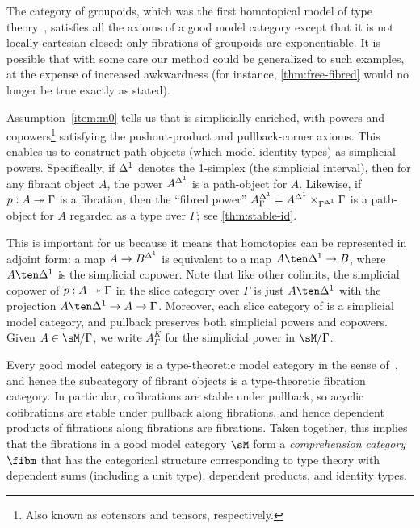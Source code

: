 \begin{noneg}
The category of groupoids, which was the first homotopical model of type theory~\cite{hs:gpd-typethy}, satisfies all the axioms of a good model category except that it is not locally cartesian closed: only fibrations of groupoids are exponentiable.
It is possible that with some care our method could be generalized to such examples, at the expense of increased awkwardness (for instance, \cref{thm:free-fibred} would no longer be true exactly as stated).
\end{noneg}

Assumption~\ref{item:m0} tells us that \sM is simplicially enriched, with powers and copowers\footnote{Also known as cotensors and tensors, respectively.} satisfying the pushout-product and pullback-corner axioms.
This enables us to construct path objects (which model identity types) as simplicial powers.
Specifically, if ${\Delta^1}$ denotes the 1-simplex (the simplicial interval), then for any fibrant object $A$, the power $A^{\Delta^1}$ is a path-object for $A$.
Likewise, if $p:A\twoheadrightarrow \Gamma$ is a fibration, then the ``fibred power'' $A^{\Delta^1}_\Gamma = A^{\Delta^1} \times_{\Gamma^{\Delta^1}} \Gamma$ is a path-object for $A$ regarded as a type over $\Gamma$; see \cref{thm:stable-id}.

This is important for us because it means that homotopies can be represented in adjoint form: a map $A\to B^{\Delta^1}$ is equivalent to a map $A\ten \ivl \to B$, where $A\ten \ivl$ is the simplicial copower.
Note that like other colimits, the simplicial copower of $p:A\twoheadrightarrow \Gamma$ in the slice category over $\Gamma$ is just $A\ten\ivl$ with the projection $A\ten\ivl \to A \to \Gamma$.
Moreover, each slice category of \sM is a simplicial model category, and pullback preserves both simplicial powers and copowers.
Given $A\in\sM/\Gamma$, we write $A^K_\Gamma$ for the simplicial power in $\sM/\Gamma$.

Every good model category is a type-theoretic model category in the sense of~\cite{shulman:invdia}, and hence the subcategory of fibrant objects is a type-theoretic fibration category.
In particular, cofibrations are stable under pullback, so acyclic cofibrations are stable under pullback along fibrations, and hence dependent products of fibrations along fibrations are fibrations.
Taken together, this implies that the fibrations in a good model category $\sM$ form a \emph{comprehension category} $\fibm$ that has the categorical structure corresponding to type theory with dependent sums (including a unit type), dependent products, and identity types.


